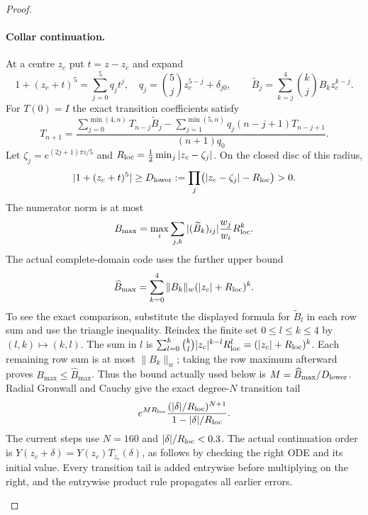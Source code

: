 \begin{proof}
\begin{enumerate}[label=\arabic*.]
\paragraph{Collar continuation.}
At a centre $z_c$ put $t=z-z_c$ and expand
\[
 1+(z_c+t)^5=\sum_{j=0}^5q_jt^j,
 \quad q_j=\binom5jz_c^{5-j}+\delta_{j0},
 \qquad
 \widetilde B_j=\sum_{k=j}^4\binom kjB_kz_c^{k-j}.
\]
For $T(0)=I$ the exact transition coefficients satisfy
\[
 T_{n+1}=
 \frac{\displaystyle
   \sum_{j=0}^{\min(4,n)}T_{n-j}\widetilde B_j
  -\sum_{j=1}^{\min(5,n)}q_j(n-j+1)T_{n-j+1}}
 {(n+1)q_0}.
\]
Let $\zeta_j=e^{(2j+1)\pi i/5}$ and
$R_{\rm loc}=\tfrac12\min_j|z_c-\zeta_j|$. On the closed disc
of this radius,
\[
 |1+(z_c+t)^5|\ge D_{\rm lower}
   :=\prod_j\bigl(|z_c-\zeta_j|-R_{\rm loc}\bigr)>0.
\]
The numerator norm is at most
\[
 B_{\max}=\max_i\sum_{j,k}|(\widetilde B_k)_{ij}|
                  \frac{w_j}{w_i}R_{\rm loc}^k.
\]
The actual complete-domain code uses the further upper bound
\[
 \widehat B_{\max}=\sum_{k=0}^4\|B_k\|_w
                           (|z_c|+R_{\rm loc})^k.
\]
To see the exact comparison, substitute the displayed formula for
$\widetilde B_l$ in each row sum and use the triangle inequality.
Reindex the finite set $0\le l\le k\le4$ by $(l,k)\mapsto(k,l)$.
The sum in $l$ is
$\sum_{l=0}^k\binom kl|z_c|^{k-l}R_{\rm loc}^l
=(|z_c|+R_{\rm loc})^k$.
Each remaining row sum is at most $\|B_k\|_w$; taking the row
maximum afterward proves $B_{\max}\le\widehat B_{\max}$.
Thus the bound actually used below is
$M=\widehat B_{\max}/D_{\rm lower}$. Radial Gronwall and Cauchy
give the exact degree-$N$ transition tail
\[
 e^{MR_{\rm loc}}
 \frac{(|\delta|/R_{\rm loc})^{N+1}}
      {1-|\delta|/R_{\rm loc}}.
\]
The current steps use $N=160$ and
$|\delta|/R_{\rm loc}<0.3$. The actual continuation order is
$Y(z_c+\delta)=Y(z_c)T_{z_c}(\delta)$, as follows by checking
the right ODE and its initial value. Every transition tail is
added entrywise before multiplying on the right, and the
entrywise product rule propagates all earlier errors.


\end{enumerate}
\end{proof}
